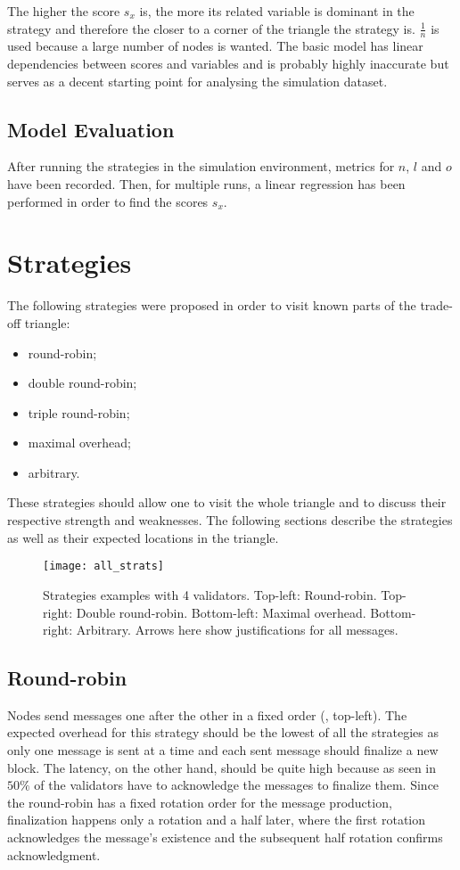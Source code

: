 The higher the score \(s_x\) is, the more its related variable is dominant in
the strategy and therefore the closer to a corner of the triangle the strategy
is.  \(\frac{1}{n}\) is used because a large number of nodes is wanted.  The
basic model has linear dependencies between scores and variables and is probably
highly inaccurate but serves as a decent starting point for analysing the
simulation dataset.

\subsection{Model Evaluation}
After running the strategies in the simulation environment, metrics for \(n\),
\(l\) and \(o\) have been recorded. Then, for multiple runs, a linear regression
has been performed in order to find the scores \(s_x\).

\section{Strategies}
\label{sec:strategies}

The following strategies were proposed in order to visit known parts of the
trade-off triangle:
\begin{itemize}
        \item round-robin;
        \item double round-robin;
        \item triple round-robin;
        \item maximal overhead;
        \item arbitrary.
\end{itemize}
These strategies should allow one to visit the whole triangle and to discuss
their respective strength and weaknesses. The following sections describe the
strategies as well as their expected locations in the triangle.

\begin{figure}[h]
	\centering
	\texttt{[image: all\_strats]}
    \caption{Strategies examples with 4 validators. Top-left: Round-robin.
    Top-right: Double round-robin. Bottom-left: Maximal overhead. Bottom-right:
    Arbitrary. Arrows here show justifications for all messages.}
	\label{fig:allStrats}
\end{figure}

\subsection{Round-robin}
Nodes send messages one after the other in a fixed order (,
top-left). The expected overhead for this strategy should be the lowest of all
the strategies as only one message is sent at a time and each sent message
should finalize a new block.  The latency, on the other hand, should be quite
high because as seen in  \(50\%\) of the validators have to
acknowledge the messages to finalize them. Since the round-robin has a fixed
rotation order for the message production, finalization happens only a rotation
and a half later, where the first rotation acknowledges the message's existence
and the subsequent half rotation confirms acknowledgment.

